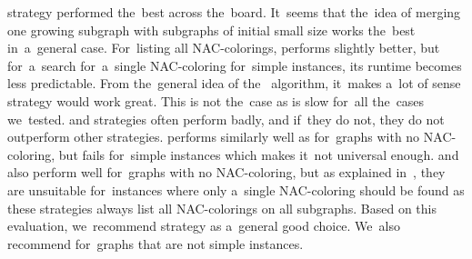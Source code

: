 \MergeLinear{} strategy performed the~best across the~board.
It~seems that the~idea of merging one growing subgraph
with subgraphs of initial small size works the~best
in~a~general case.
%
For~listing all NAC-colorings, \SharedVertices{} performs
slightly better, but for~a~search for~a~single NAC-coloring for~simple instances,
its runtime becomes less predictable.
%
From the~general idea of the~\Subgraphs{} algorithm,
it~makes a~lot of sense \Log{} strategy would work great.
This is not the~case as \Log{} is slow for~all the~cases we~tested.
%
\MinMax{} and \SortedBits{} strategies often perform badly,
and if~they do not, they do not outperform other strategies.
%
\PromisingCycles{} performs similarly well as \Neighbors{}
for~graphs with no NAC-coloring,
but fails for~simple instances which makes it~not universal enough.
%
\SortedSize{} and \Score{} also perform well for~graphs with no NAC-coloring,
but as explained in~,
they are unsuitable for~instances where only a~single NAC-coloring
should be found as these strategies always list all NAC-colorings
on all subgraphs.
%
Based on this evaluation, we~recommend strategy \MergeLinear{} as a~general good choice.
We~also recommend \SharedVertices{} for~graphs that are not simple instances.

